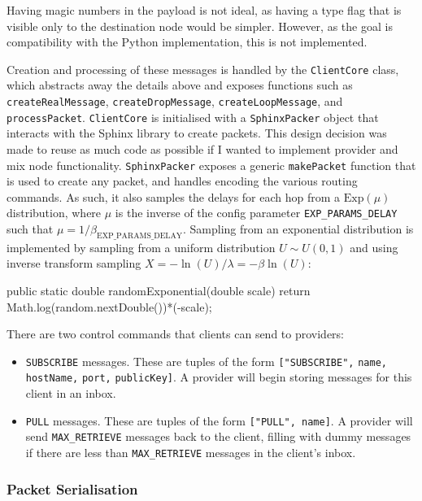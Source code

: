\documentclass[final,dissertation.tex]{subfiles}
\begin{document}
Having magic numbers in the payload is not ideal, as having a type flag that is visible only to the destination node would be simpler. However, as the goal is compatibility with the Python implementation, this is not implemented.

Creation and processing of these messages is handled by the \verb|ClientCore| class, which abstracts away the details above and exposes functions such as \verb|createRealMessage|, \verb|createDropMessage|, \verb|createLoopMessage|, and \verb|processPacket|.  \verb|ClientCore| is initialised with a \verb|SphinxPacker| object that interacts with the Sphinx library to create packets. This design decision was made to reuse as much code as possible if I wanted to implement provider and mix node functionality. \verb|SphinxPacker| exposes a generic \verb|makePacket| function that is used to create any packet, and handles encoding the various routing commands. As such, it also samples the delays for each hop from a $\text{Exp}(\mu)$ distribution, where $\mu$ is the inverse of the config parameter \verb|EXP_PARAMS_DELAY| such that $\mu = 1/\beta_\text{EXP\_PARAMS\_DELAY}$. Sampling from an exponential distribution is implemented by sampling from a uniform distribution $U \sim U(0,1)$ and using inverse transform sampling $X = -\ln(U)/\lambda = -\beta\ln(U)$:

\begin{javacode}
public static double randomExponential(double scale) {
    return Math.log(random.nextDouble())*(-scale);
}
\end{javacode}

There are two control commands that clients can send to providers:

\begin{itemize}
	\item \verb|SUBSCRIBE| messages. These are tuples of the form \verb|[|\verb|"SUBSCRIBE",| \verb|name,| \verb|hostName,| \verb|port,| \verb|publicKey|\verb|]|. A provider will begin storing messages for this client in an inbox.
	\item \verb|PULL| messages. These are tuples of the form \verb|["PULL", name]|. A provider will send \verb|MAX_RETRIEVE| messages back to the client, filling with dummy messages if there are less than \verb|MAX_RETRIEVE| messages in the client's inbox.
\end{itemize}

\subsubsection{Packet Serialisation} \label{sec:serialisation}
\end{document}
